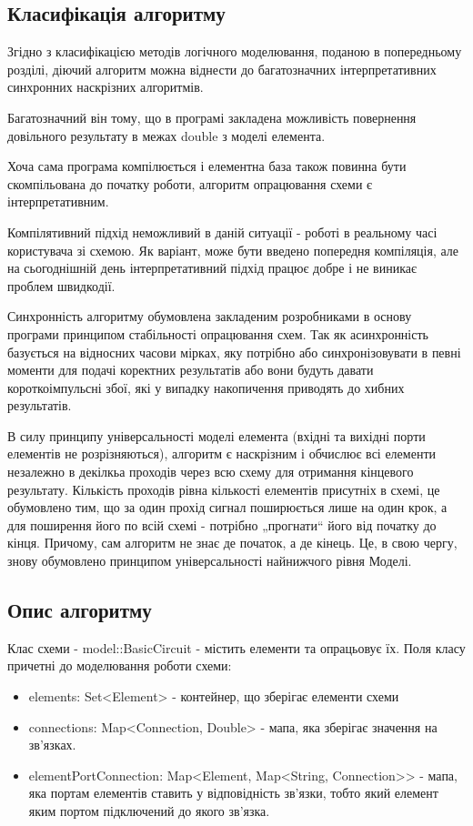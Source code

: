 \documentclass[12pt,a4paper]{article}
\begin{document}
\subsection{Класифікація алгоритму}

Згідно з класифікацією методів логічного моделювання, поданою в попередньому розділі, діючий алгоритм можна віднести до багатозначних інтерпретативних синхронних наскрізних алгоритмів.

Багатозначний він тому, що в програмі закладена можливість повернення довільного результату в межах double з моделі елемента.

Хоча сама програма компілюється і елементна база також повинна бути скомпільована до початку роботи, алгоритм опрацювання схеми є інтерпретативним.

Компілятивний підхід неможливий в даній ситуації - роботі в реальному часі користувача зі схемою. Як варіант, може бути введено попередня компіляція, але на сьогоднішній день інтерпретативний підхід працює добре і не виникає проблем швидкодії.

Синхронність алгоритму обумовлена закладеним розробниками в основу програми принципом стабільності опрацювання схем. Так як асинхронність базується на відносних часови мірках, яку потрібно або синхронізовувати в певні моменти для подачі коректних результатів або вони будуть давати короткоімпульсні збої, які у випадку накопичення приводять до хибних результатів.

В силу принципу універсальності моделі елемента (вхідні та вихідні порти елементів не розрізняються), алгоритм є наскрізним і обчислює всі елементи незалежно в декілкьа проходів через всю схему для отримання кінцевого результату. Кількість проходів рівна кількості елементів присутніх в схемі, це обумовлено тим, що за один прохід сигнал поширюється лише на один крок, а для поширення його по всій схемі - потрібно „прогнати“ його від початку до кінця. Причому, сам алгоритм не знає де початок, а де кінець. Це, в свою чергу, знову обумовлено принципом універсальності найнижчого рівня Моделі.

\subsection{Опис алгоритму}

Клас схеми - model::BasicCircuit - містить елементи та опрацьовує їх.
Поля класу причетні до моделювання роботи схеми:
\begin{itemize}
  \item elements: Set<Element> - контейнер, що зберігає елементи схеми
  \item connections: Map<Connection, Double> - мапа, яка зберігає значення на зв’язках.
  \item elementPortConnection: Map<Element, Map<String, Connection>> - мапа, яка портам елементів ставить у відповідність зв’язки, тобто який елемент яким портом підключений до якого зв’язка.
\end{itemize}
\end{document}
